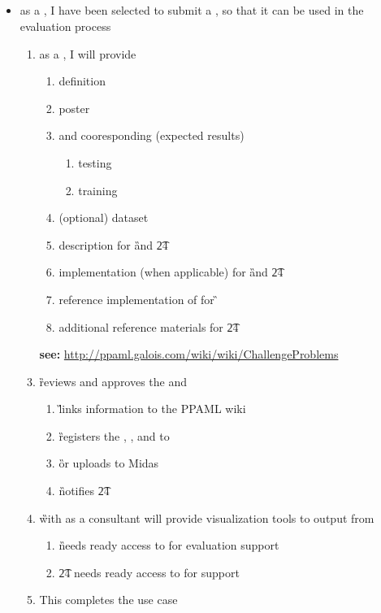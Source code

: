 \documentclass[8pt,letterpaper]{article} %
\newenvironment{slimlist}{
  \begin{itemize}
    \setlength{\topsep}{0pt}
    \setlength{\itemsep}{1pt}
    \setlength{\parsep}{0pt}
    \setlength{\parskip}{0pt}
}{\end{itemize}}
\newenvironment{mitemize}[1]{
  \subsection*{#1}
  \begin{slimlist}
}{
\end{slimlist}
\vspace{1em}
\pagebreak
}
\begin{document}
\begin{mitemize}{\de}
\item as a \de, I have been selected to submit a \cp, so that it can be used in the evaluation process
  \begin{enumerate}
    
  \item as a \de, I will provide 
    \begin{enumerate}
    \item \cp definition
    \item \cp poster 
    \item \ds and cooresponding \gs (expected results)
      \begin{enumerate}
      \item testing
      \item training
      \end{enumerate}
    \item (optional) dataset  \gen
    \item \tev description for \G and \t24
    \item \tev implementation (when applicable) for \G and \t24
    \item reference implementation of \sol for \G
    \item additional reference materials for \t24 
    \end{enumerate}
  \item[{\bf see:}] \url{http://ppaml.galois.com/wiki/wiki/ChallengeProblems}
  \item \G reviews and approves the \cp and 
    \begin{enumerate}
    \item \G links \cp information to the PPAML wiki
    \item \G registers the \ds, \cp, and \tev to \ptk
    \item \G or \de uploads \ds to Midas
    \item \G notifies \t24
    \end{enumerate}
  \item \G with \de as a consultant will provide visualization tools to \rep output from 
    \begin{enumerate}
    \item \G needs ready access to \de for evaluation support
    \item \t24 needs ready access to \de for \cp support
    \end{enumerate}
  \item This completes the use case
  \end{enumerate}
\end{mitemize}
\end{document}
